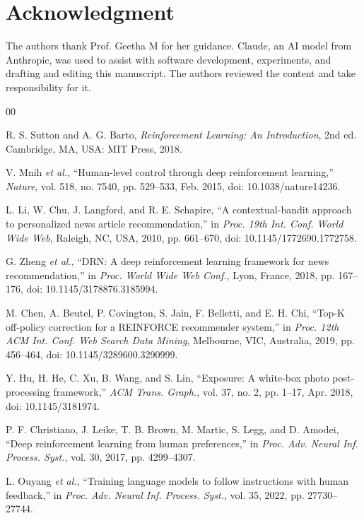 \documentclass{ieeeaccess}
\begin{document}
\section*{Acknowledgment}
The authors thank Prof. Geetha M for her guidance. Claude, an AI model from Anthropic, was used to assist with software development, experiments, and drafting and editing this manuscript. The authors reviewed the content and take responsibility for it.

\begin{thebibliography}{00}

 R. S. Sutton and A. G. Barto, \emph{Reinforcement Learning: An Introduction}, 2nd ed. Cambridge, MA, USA: MIT Press, 2018.

 V. Mnih \emph{et al.}, ``Human-level control through deep reinforcement learning,'' \emph{Nature}, vol. 518, no. 7540, pp. 529--533, Feb. 2015, doi: 10.1038/nature14236.

 L. Li, W. Chu, J. Langford, and R. E. Schapire, ``A contextual-bandit approach to personalized news article recommendation,'' in \emph{Proc. 19th Int. Conf. World Wide Web}, Raleigh, NC, USA, 2010, pp. 661--670, doi: 10.1145/1772690.1772758.

 G. Zheng \emph{et al.}, ``DRN: A deep reinforcement learning framework for news recommendation,'' in \emph{Proc. World Wide Web Conf.}, Lyon, France, 2018, pp. 167--176, doi: 10.1145/3178876.3185994.

 M. Chen, A. Beutel, P. Covington, S. Jain, F. Belletti, and E. H. Chi, ``Top-K off-policy correction for a REINFORCE recommender system,'' in \emph{Proc. 12th ACM Int. Conf. Web Search Data Mining}, Melbourne, VIC, Australia, 2019, pp. 456--464, doi: 10.1145/3289600.3290999.

 Y. Hu, H. He, C. Xu, B. Wang, and S. Lin, ``Exposure: A white-box photo post-processing framework,'' \emph{ACM Trans. Graph.}, vol. 37, no. 2, pp. 1--17, Apr. 2018, doi: 10.1145/3181974.

 P. F. Christiano, J. Leike, T. B. Brown, M. Martic, S. Legg, and D. Amodei, ``Deep reinforcement learning from human preferences,'' in \emph{Proc. Adv. Neural Inf. Process. Syst.}, vol. 30, 2017, pp. 4299--4307.

 L. Ouyang \emph{et al.}, ``Training language models to follow instructions with human feedback,'' in \emph{Proc. Adv. Neural Inf. Process. Syst.}, vol. 35, 2022, pp. 27730--27744.


\end{thebibliography}
\end{document}
